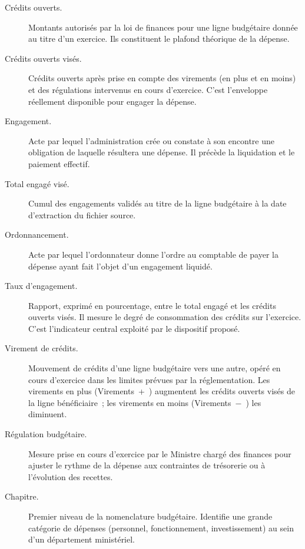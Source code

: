 \begin{description}
\item[Cr\'edits ouverts.] Montants autoris\'es par la loi de finances
pour une ligne budg\'etaire donn\'ee au titre d'un exercice. Ils
constituent le plafond th\'eorique de la d\'epense.

\item[Cr\'edits ouverts vis\'es.] Cr\'edits ouverts apr\`es prise en
compte des virements (en plus et en moins) et des r\'egulations
intervenus en cours d'exercice. C'est l'enveloppe r\'eellement
disponible pour engager la d\'epense.

\item[Engagement.] Acte par lequel l'administration cr\'ee ou constate
\`a son encontre une obligation de laquelle r\'esultera une d\'epense.
Il pr\'ec\`ede la liquidation et le paiement effectif.

\item[Total engag\'e vis\'e.] Cumul des engagements valid\'es au titre
de la ligne budg\'etaire \`a la date d'extraction du fichier source.

\item[Ordonnancement.] Acte par lequel l'ordonnateur donne l'ordre au
comptable de payer la d\'epense ayant fait l'objet d'un engagement
liquid\'e.

\item[Taux d'engagement.] Rapport, exprim\'e en pourcentage, entre le
total engag\'e et les cr\'edits ouverts vis\'es. Il mesure le degr\'e
de consommation des cr\'edits sur l'exercice. C'est l'indicateur
central exploit\'e par le dispositif propos\'e.

\item[Virement de cr\'edits.] Mouvement de cr\'edits d'une ligne
budg\'etaire vers une autre, op\'er\'e en cours d'exercice dans les
limites pr\'evues par la r\'eglementation. Les virements en plus
(\og Virements~+~\fg{}) augmentent les cr\'edits ouverts vis\'es de la
ligne b\'en\'eficiaire~; les virements en moins
(\og Virements~$-$~\fg{}) les diminuent.

\item[R\'egulation budg\'etaire.] Mesure prise en cours d'exercice par
le Ministre charg\'e des finances pour ajuster le rythme de la d\'epense
aux contraintes de tr\'esorerie ou \`a l'\'evolution des recettes.

\item[Chapitre.] Premier niveau de la nomenclature budg\'etaire.
Identifie une grande cat\'egorie de d\'epenses (personnel,
fonctionnement, investissement) au sein d'un d\'epartement minist\'eriel.


\end{description}
